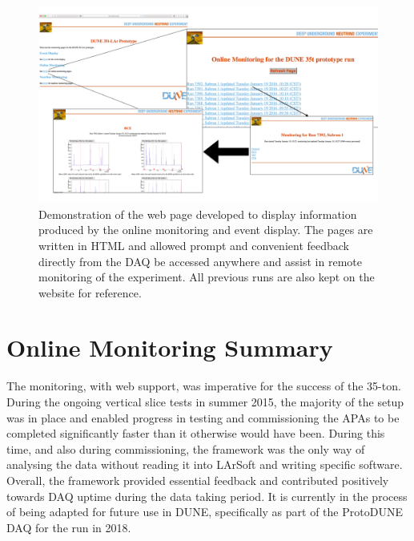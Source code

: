 \begin{figure}
  \centering
  \includegraphics[width=14cm]{webPage.png}
  \caption[Demonstration of the web page developed to display information produced by the online monitoring and event display.]{Demonstration of the web page developed to display information produced by the online monitoring and event display.  The pages are written in HTML and allowed prompt and convenient feedback directly from the DAQ be accessed anywhere and assist in remote monitoring of the experiment.  All previous runs are also kept on the website for reference.}
  \label{fig:WebPage}
\end{figure}

\section{Online Monitoring Summary}

The monitoring, with web support, was imperative for the success of the 35-ton.  During the ongoing vertical slice tests in summer 2015, the majority of the setup was in place and enabled progress in testing and commissioning the APAs to be completed significantly faster than it otherwise would have been.  During this time, and also during commissioning, the framework was the only way of analysing the data without reading it into LArSoft and writing specific software.  Overall, the framework provided essential feedback and contributed positively towards DAQ uptime during the data taking period.  It is currently in the process of being adapted for future use in DUNE, specifically as part of the ProtoDUNE DAQ for the run in 2018.
